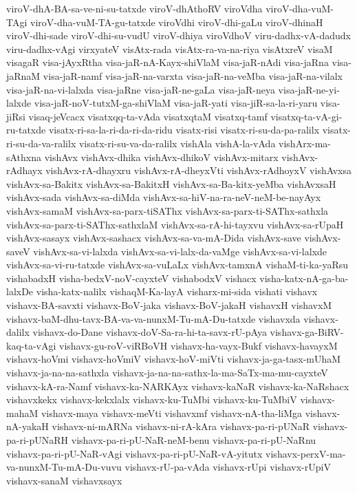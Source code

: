 {viroV-dhA-BA-sa-ve-ni-su-tatxde
viroV-dhAthoRV
viroVdha
viroV-dha-vuM-TAgi
viroV-dha-vuM-TA-gu-tatxde
viroVdhi
viroV-dhi-gaLu
viroV-dhinaH
viroV-dhi-sade
viroV-dhi-su-vudU
viroV-dhiya
viroVdhoV
viru-dadhx-vA-dadudx
viru-dadhx-vAgi
virxyateV
visAtx-rada
visAtx-ra-va-na-riya
visAtxreV
visaM
visagaR
visa-jAyxRtha
visa-jaR-nA-Kayx-shiVlaM
visa-jaR-nAdi
visa-jaRna
visa-jaRnaM
visa-jaR-namf
visa-jaR-na-varxta
visa-jaR-na-veMba
visa-jaR-na-vilalx
visa-jaR-na-vi-lalxda
visa-jaRne
visa-jaR-ne-gaLa
visa-jaR-neya
visa-jaR-ne-yi-lalxde
visa-jaR-noV-tutxM-ga-shiVlaM
visa-jaR-yati
visa-jiR-sa-la-ri-yaru
visa-jiRsi
visaq-jeVcacx
visatxqq-ta-vAda
visatxqtaM
visatxq-tamf
visatxq-ta-vA-gi-ru-tatxde
visatx-ri-sa-la-ri-da-ri-da-ridu
visatx-risi
visatx-ri-su-da-pa-ralilx
visatx-ri-su-da-va-ralilx
visatx-ri-su-va-da-ralilx
vishAla
vishA-la-vAda
vishArx-ma-sAthxna
vishAvx
vishAvx-dhika
vishAvx-dhikoV
vishAvx-mitarx
vishAvx-rAdhayx
vishAvx-rA-dhayxru
vishAvx-rA-dheyxVti
vishAvx-rAdhoyxV
vishAvxsa
vishAvx-sa-Bakitx
vishAvx-sa-BakitxH
vishAvx-sa-Ba-kitx-yeMba
vishAvxsaH
vishAvx-sada
vishAvx-sa-diMda
vishAvx-sa-hiV-na-ra-neV-neM-be-nayAyx
vishAvx-samaM
vishAvx-sa-parx-tiSAThx
vishAvx-sa-parx-ti-SAThx-sathxla
vishAvx-sa-parx-ti-SAThx-sathxlaM
vishAvx-sa-rA-hi-tayxvu
vishAvx-sa-rUpaH
vishAvx-sasayx
vishAvx-sashacx
vishAvx-sa-va-mA-Dida
vishAvx-save
vishAvx-saveV
vishAvx-sa-vi-lalxda
vishAvx-sa-vi-lalx-da-vaMge
vishAvx-sa-vi-lalxde
vishAvx-sa-vi-ru-tatxde
vishAvx-sa-vuLaLx
vishAvx-tamxnA
vishaM-ti-ka-yaRsu
vishabadxH
visha-bedxV-noV-cayxteV
vishabodxV
vishacx
visha-katx-nA-ga-ba-lalxDe
visha-katx-nalilx
vishaqM-Ka-layA
visharx-mi-sida
vishati
vishavx
vishavx-BA-savxti
vishavx-BoV-jaka
vishavx-BoV-jakaH
vishavxH
vishavxM
vishavx-baM-dhu-tavx-BA-va-va-nunxM-Tu-mA-Du-tatxde
vishavxda
vishavx-dalilx
vishavx-do-Dane
vishavx-doV-Sa-ra-hi-ta-savx-rU-pAya
vishavx-ga-BiRV-kaq-ta-vAgi
vishavx-gu-roV-viRBoVH
vishavx-ha-vayx-Bukf
vishavx-havayxM
vishavx-hoVmi
vishavx-hoVmiV
vishavx-hoV-miVti
vishavx-ja-ga-tasx-mUhaM
vishavx-ja-na-na-sathxla
vishavx-ja-na-na-sathx-la-ma-SaTx-ma-mu-cayxteV
vishavx-kA-ra-Namf
vishavx-ka-NARKAyx
vishavx-kaNaR
vishavx-ka-NaRshacx
vishavxkekx
vishavx-kekxlalx
vishavx-ku-TuMbi
vishavx-ku-TuMbiV
vishavx-mahaM
vishavx-maya
vishavx-meVti
vishavxmf
vishavx-nA-tha-liMga
vishavx-nA-yakaH
vishavx-ni-mARNa
vishavx-ni-rA-kAra
vishavx-pa-ri-pUNaR
vishavx-pa-ri-pUNaRH
vishavx-pa-ri-pU-NaR-neM-benu
vishavx-pa-ri-pU-NaRnu
vishavx-pa-ri-pU-NaR-vAgi
vishavx-pa-ri-pU-NaR-vA-yitutx
vishavx-perxV-ma-va-nunxM-Tu-mA-Du-vuvu
vishavx-rU-pa-vAda
vishavx-rUpi
vishavx-rUpiV
vishavx-sanaM
vishavxsayx
}
